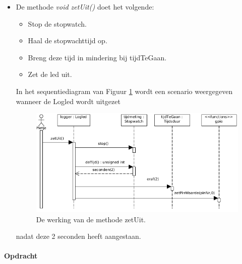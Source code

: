 \begin{itemize}
 \item De methode \textit{void zetUit()} doet het volgende: 
 \begin{itemize}
 	\item Stop de stopwatch.
 	\item Haal de stopwachttijd op.
 	\item Breng deze tijd in mindering bij tijdTeGaan.
 	\item Zet de led uit.
 \end{itemize} 
 In het sequentiediagram van Figuur \ref{fig:ll_zetUit} wordt een scenario weergegeven wanneer de Logled wordt uitgezet
  \begin{figure}[h!]
	\captionsetup{justification=centering}
	\includegraphics[width=0.8 \linewidth]{figuren/seqZetUit}      %
\centering
\caption{De werking van de methode zetUit.}
\label{fig:ll_zetUit}
\end{figure} 
nadat deze 2 seconden heeft aangestaan.
\end{itemize}
\newpage
\paragraph{Opdracht}

